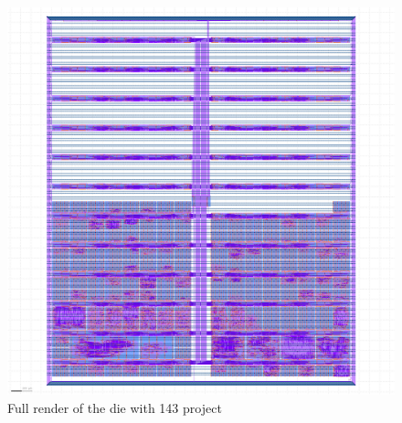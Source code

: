 \begin{figure}
    \centering
    \includegraphics[width=\linewidth]{Pictures/fullfabricationdie.png}
    \caption{Full render of the die with 143 project}\label{fig:Layout}
\end{figure}
